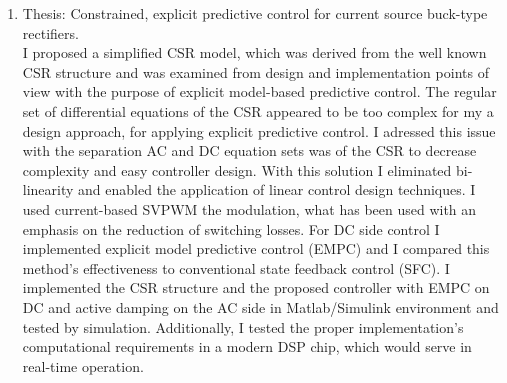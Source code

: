 \begin{enumerate}
\item Thesis: Constrained, explicit predictive control for current source buck-type rectifiers.\\
    I proposed a simplified CSR model, which was derived from the well known CSR structure and was examined from design and implementation points of view with the purpose of explicit model-based predictive control. The regular set of differential equations of the CSR appeared to be too complex for my a design approach, for applying explicit predictive control. I adressed this issue with the separation AC and DC equation sets was of the CSR to decrease complexity and easy controller design. With this solution I eliminated bi-linearity and enabled the application of linear control design techniques. I used current-based SVPWM the modulation, what has been used with an emphasis on the reduction of switching losses. For DC side control I implemented explicit model predictive control (EMPC) and I compared this method's effectiveness to conventional state feedback control (SFC). I implemented the CSR structure and the proposed controller with EMPC on DC and active damping on the AC side in Matlab/Simulink environment and tested by simulation. Additionally, I tested the proper implementation's computational requirements in a modern DSP chip, which would serve in real-time operation.
\end{enumerate}
